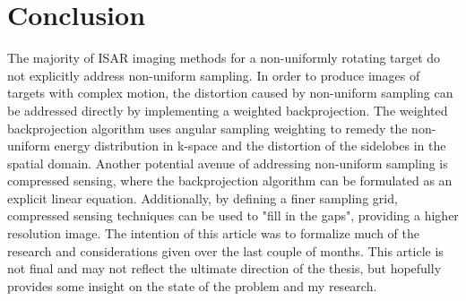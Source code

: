 \documentclass[conference]{IEEEtran}
\begin{document}
\section{Conclusion}

The majority of ISAR imaging methods for a non-uniformly rotating target do not explicitly address non-uniform sampling. In order to produce images of targets with complex motion, the distortion caused by non-uniform sampling can be addressed directly by implementing a weighted backprojection. The weighted backprojection algorithm uses angular sampling weighting to remedy the non-uniform energy distribution in k-space and the distortion of the sidelobes in the spatial domain. Another potential avenue of addressing non-uniform sampling is compressed sensing, where the backprojection algorithm can be formulated as an explicit linear equation. Additionally, by defining a finer sampling grid, compressed sensing techniques can be used to "fill in the gaps", providing a higher resolution image. The intention of this article was to formalize much of the research and considerations given over the last couple of months. This article is not final and may not reflect the ultimate direction of the thesis, but hopefully provides some insight on the state of the problem and my research.

\printbibliography

\end{document}
